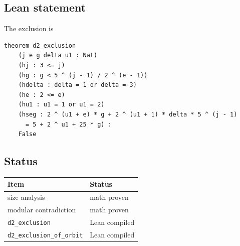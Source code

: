 \subsection{Lean statement}

The exclusion is
\begin{verbatim}
theorem d2_exclusion
    (j e g delta u1 : Nat)
    (hj : 3 <= j)
    (hg : g < 5 ^ (j - 1) / 2 ^ (e - 1))
    (hdelta : delta = 1 or delta = 3)
    (he : 2 <= e)
    (hu1 : u1 = 1 or u1 = 2)
    (hseg : 2 ^ (u1 + e) * g + 2 ^ (u1 + 1) * delta * 5 ^ (j - 1)
      = 5 + 2 ^ u1 + 25 * g) :
    False
\end{verbatim}

\subsection{Status}

\begin{center}
\small
\begin{tabular}{@{}p{}p{}@{}}
\toprule
Item & Status \\
\midrule
size analysis & math proven \\
modular contradiction & math proven \\
\texttt{d2\_\allowbreak exclusion} & Lean compiled \\
\texttt{d2\_\allowbreak exclusion\_\allowbreak of\_\allowbreak orbit} &
  Lean compiled \\
\bottomrule
\end{tabular}
\end{center}
